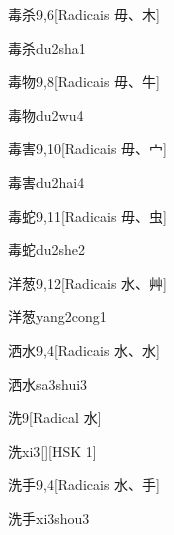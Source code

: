 \begin{entry}{毒杀}{9,6}[Radicais ⽏、⽊]
  \begin{phonetics}{毒杀}{du2sha1}
  \end{phonetics}
\end{entry}

\begin{entry}{毒物}{9,8}[Radicais ⽏、⽜]
  \begin{phonetics}{毒物}{du2wu4}
  \end{phonetics}
\end{entry}

\begin{entry}{毒害}{9,10}[Radicais ⽏、⼧]
  \begin{phonetics}{毒害}{du2hai4}
  \end{phonetics}
\end{entry}

\begin{entry}{毒蛇}{9,11}[Radicais ⽏、⾍]
  \begin{phonetics}{毒蛇}{du2she2}
  \end{phonetics}
\end{entry}

\begin{entry}{洋葱}{9,12}[Radicais ⽔、⾋]
  \begin{phonetics}{洋葱}{yang2cong1}
  \end{phonetics}
\end{entry}

\begin{entry}{洒水}{9,4}[Radicais ⽔、⽔]
  \begin{phonetics}{洒水}{sa3shui3}
  \end{phonetics}
\end{entry}

\begin{entry}{洗}{9}[Radical ⽔]
  \begin{phonetics}{洗}{xi3}[][HSK 1]
  \end{phonetics}
\end{entry}

\begin{entry}{洗手}{9,4}[Radicais ⽔、⼿]
  \begin{phonetics}{洗手}{xi3shou3}
  \end{phonetics}
\end{entry}


